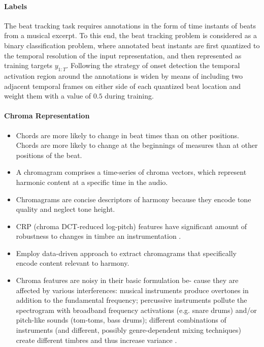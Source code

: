 \documentclass{scrartcl}
\begin{document}
\paragraph{Labels}
The beat tracking task requires annotations in the form of time instants of beats from a musical excerpt. To this end, the beat tracking problem is considered as a binary classification problem, where annotated beat instants are first quantized to the temporal resolution of the input representation, and then represented as training targets $y_{1:T}$. Following the strategy of onset detection \cite{Schluter2014} the temporal activation region around the annotations is widen by means of including two adjacent temporal frames on either side of each quantized beat location and weight them with a value of $0.5$ during training. 




\paragraph{Chroma Representation}

\begin{itemize}
\item Chords are more likely to change in beat times than on other positions. Chords are more likely to change at the beginnings of measures than at other positions of the beat.
\item A chromagram comprises a time-series of chroma vectors, which represent harmonic content at a specific time in the audio.
\item Chromagrams are concise descriptors of harmony because they encode tone quality and neglect tone height.
\item CRP (chroma DCT-reduced log-pitch) features have significant amount of robustness to changes in timbre an instrumentation \cite{Mueller2010}.
\item Employ data-driven approach to extract chromagrams that specifically encode content relevant to harmony.
\item Chroma features are noisy in their basic formulation be- cause they are affected by various interferences: musical instruments produce overtones in addition to the fundamental frequency; percussive instruments pollute the spectrogram with broadband frequency activations (e.g. snare drums) and/or pitch-like sounds (tom-toms, bass drums); different combinations of instruments (and different, possibly genre-dependent mixing techniques) create different timbres and thus increase variance \cite{Korzeniowski2016}.
\end{itemize}
\end{document}
